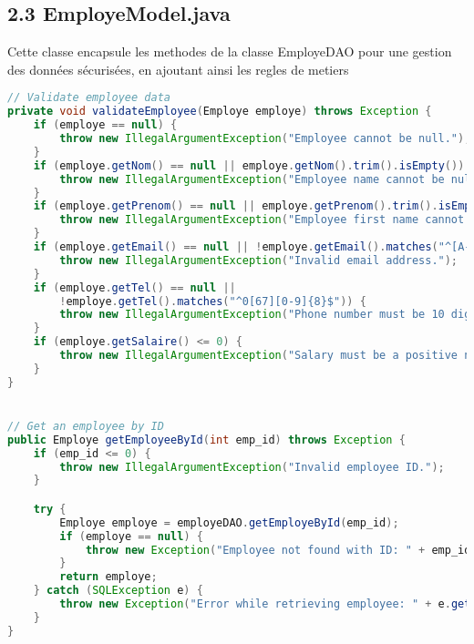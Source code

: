 \documentclass[a4paper,12pt]{report}
\begin{document}
\subsection*{\textcolor{mygreen}{2.3 EmployeModel.java}}
Cette classe encapsule les methodes de la classe EmployeDAO pour une gestion des données sécurisées, en ajoutant ainsi les regles de metiers 
\begin{lstlisting}[language=Java, caption=Exemple de quelques methodes]
// Validate employee data
private void validateEmployee(Employe employe) throws Exception {
    if (employe == null) {
        throw new IllegalArgumentException("Employee cannot be null.");
    }
    if (employe.getNom() == null || employe.getNom().trim().isEmpty()) {
        throw new IllegalArgumentException("Employee name cannot be null or empty.");
    }
    if (employe.getPrenom() == null || employe.getPrenom().trim().isEmpty()) {
        throw new IllegalArgumentException("Employee first name cannot be null or empty.");
    }
    if (employe.getEmail() == null || !employe.getEmail().matches("^[A-Za-z0-9+_.-]+@[A-Za-z0-9.-]+$")) {
        throw new IllegalArgumentException("Invalid email address.");
    }
    if (employe.getTel() == null || 
        !employe.getTel().matches("^0[67][0-9]{8}$")) {
        throw new IllegalArgumentException("Phone number must be 10 digits and start with 06 or 07.");
    }
    if (employe.getSalaire() <= 0) {
        throw new IllegalArgumentException("Salary must be a positive number.");
    }
}


// Get an employee by ID
public Employe getEmployeeById(int emp_id) throws Exception {
    if (emp_id <= 0) {
        throw new IllegalArgumentException("Invalid employee ID.");
    }

    try {
        Employe employe = employeDAO.getEmployeById(emp_id);
        if (employe == null) {
            throw new Exception("Employee not found with ID: " + emp_id);
        }
        return employe;
    } catch (SQLException e) {
        throw new Exception("Error while retrieving employee: " + e.getMessage(), e);
    }
}
\end{lstlisting}
\end{document}
